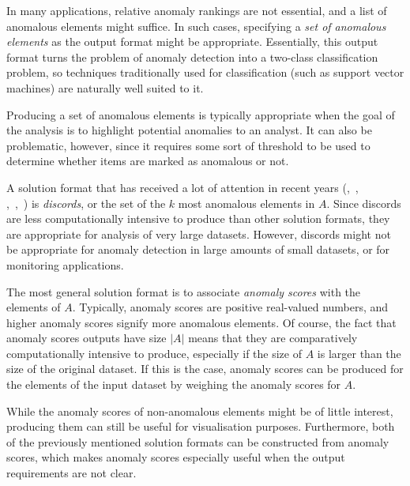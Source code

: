 In many applications, relative anomaly rankings are not essential, and a list of anomalous elements might suffice. In such cases, specifying a \emph{set of anomalous elements} as the output format might be appropriate. Essentially, this output format turns the problem of anomaly detection into a two-class classification problem, so techniques traditionally used for classification (such as support vector machines) are naturally well suited to it.

Producing a set of anomalous elements is typically appropriate when the goal of the analysis is to highlight potential anomalies to an analyst. It can also be problematic, however, since it requires some sort of threshold to be used to determine whether items are marked as anomalous or not.

A solution format that has received a lot of attention in recent years (\cite{keogh1},~\cite{bu},\\\cite{yankov},~\cite{fu},~\cite{lin}) is \emph{discords}, or the set of the $k$ most anomalous elements in $A$. Since discords are less computationally intensive to produce than other solution formats, they are appropriate for analysis of very large datasets. However, discords might not be appropriate for anomaly detection in large amounts of small datasets, or for monitoring applications.

The most general solution format is to associate \emph{anomaly scores} with the elements of $A$. Typically, anomaly scores are positive real-valued numbers, and higher anomaly scores signify more anomalous elements. Of course, the fact that anomaly scores outputs have size $|A|$ means that they are comparatively computationally intensive to produce, especially if the size of $A$ is larger than the size of the original dataset. If this is the case, anomaly scores can be produced for the elements of the input dataset by weighing the anomaly scores for $A$.

While the anomaly scores of non-anomalous elements might be of little interest, producing them can still be useful for visualisation purposes. Furthermore, both of the previously mentioned solution formats can be constructed from anomaly scores, which makes anomaly scores especially useful when the output requirements are not clear.
